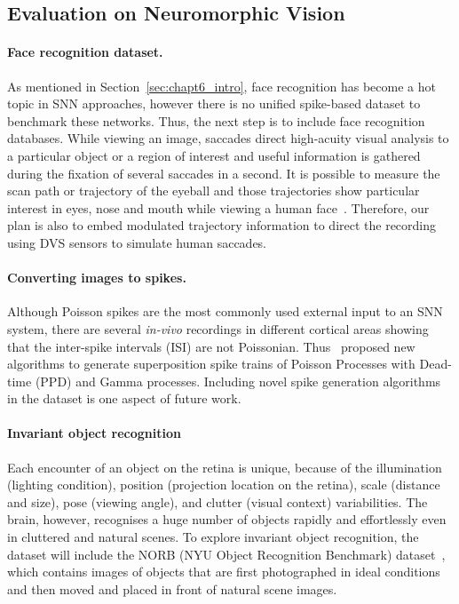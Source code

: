\subsection{Evaluation on Neuromorphic Vision}

\paragraph{Face recognition dataset.}
As mentioned in Section~\ref{sec:chapt6_intro}, face recognition has become a hot topic in SNN approaches, however there is no unified spike-based dataset to benchmark these networks.
Thus, the next step is to include face recognition databases.
While viewing an image, saccades direct high-acuity visual analysis to a particular object or a region of interest and useful information is gathered during the fixation of several saccades in a second.
It is possible to measure the scan path or trajectory of the eyeball and those trajectories show particular interest in eyes, nose and mouth while viewing a human face~\citep{yarbus1967eye}.
Therefore, our plan is also to embed modulated trajectory information to direct the recording using DVS sensors to simulate human saccades.

\paragraph{Converting images to spikes.}
Although Poisson spikes are the most commonly used external input to an SNN system, there are several \textit{in-vivo} recordings in different cortical areas showing that the inter-spike intervals (ISI) are not Poissonian. 
Thus~\citet{deger2012statistical} proposed new algorithms to generate superposition spike trains of Poisson Processes with Dead-time (PPD) and Gamma processes.
Including novel spike generation algorithms in the dataset is one aspect of future work.

\paragraph{Invariant object recognition}
Each encounter of an object on the retina is unique, because of the illumination (lighting condition), position (projection location on the retina), scale (distance and size), pose (viewing angle), and clutter (visual context) variabilities.
The brain, however, recognises a huge number of objects rapidly and effortlessly even in cluttered and natural scenes.
To explore invariant object recognition, the dataset will include the NORB (NYU Object Recognition Benchmark) dataset~\citep{lecun2004learning}, which contains images of objects that are first photographed in ideal conditions and then moved and placed in front of natural scene images.

